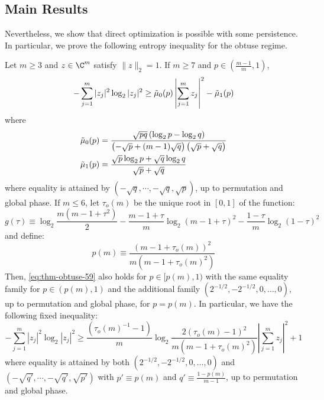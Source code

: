 \documentclass[11pt]{article}
\begin{document}
\subsection{Main Results}
Nevertheless, we show that direct optimization is possible with some persistence. In particular, we prove the following entropy inequality for the obtuse regime. 

\begin{theorem}\label{thm:obtuse-59-67}
   Let $m\geq 3$ and $z\in \C^m $ satisfy $\|z\|_2=1$. If $m\geq 7$ and $p\in \left(\frac{m-1}{m},1\right)$,
   \begin{equation}\label{eq:thm-obtuse-59}
       -\sum_{j=1}^m |z_j|^2 \log_2 |z_j|^2 \geq \Tilde \mu_0(p)\left|\sum_{j=1}^m z_j\right|^2 -\Tilde \mu_1(p)
   \end{equation}
   where 
   \begin{equation}
   \begin{aligned}
       \Tilde \mu_0(p)&=\frac{\sqrt{pq}\left(\log_2 p-\log_2 q\right)}{\left(-\sqrt p+(m-1)\sqrt{q}\right)\left(\sqrt p+\sqrt{q}\right)}\\
       \Tilde \mu_1(p)&=\frac{\sqrt p\log_2 p+\sqrt{q}\log_2 q}{\sqrt p+\sqrt{q}}
   \end{aligned}
   \end{equation}
   where equality is attained by $(-\sqrt{q},\cdots,-\sqrt{q},\sqrt p)$, up to permutation and global phase. If $m\leq 6$, let $\tau_o(m)$ be the unique root in $[0,1]$ of the function:
   \begin{equation}
       g(\tau)\equiv \log_2 \frac{m(m-1+\tau^2)}{2}-\frac{m-1+\tau}{m}\log_2(m-1+\tau)^2-\frac{1-\tau}{m}\log_2(1-\tau)^2
   \end{equation}
   and define:
   \begin{equation}
       p(m)\equiv \frac{(m-1+\tau_o(m))^2}{m(m-1+\tau_o(m)^2)}
   \end{equation}
   Then, \eqref{eq:thm-obtuse-59} also holds for $p\in [p(m),1)$ with the same equality family for $p\in (p(m),1)$ and the additional family $(2^{-1/2},-2^{-1/2},0,\dots,0)$, up to permutation and global phase, for $p=p(m)$. In particular, we have the following fixed inequality:
   \begin{equation}\label{eq:thm-obtuse-67}
       -\sum_{j=1}^m |z_j|^2 \log_2 |z_j|^2 \geq \frac{(\tau_o(m)^{-1}-1)}{m}\log_2 \frac{2(\tau_o(m)-1)^2}{m(m-1+\tau_o(m)^2)}\left|\sum_{j=1}^mz_j\right|^2+1
   \end{equation}
   where equality is attained by both $(2^{-1/2},-2^{-1/2},0,\dots,0)$ and $(-\sqrt{q'},\cdots,-\sqrt{q'},\sqrt{p'})$ with $p'\equiv p(m)$ and $q'\equiv \frac{1-p(m)}{m-1}$, up to permutation and global phase.
\end{theorem}
\end{document}
